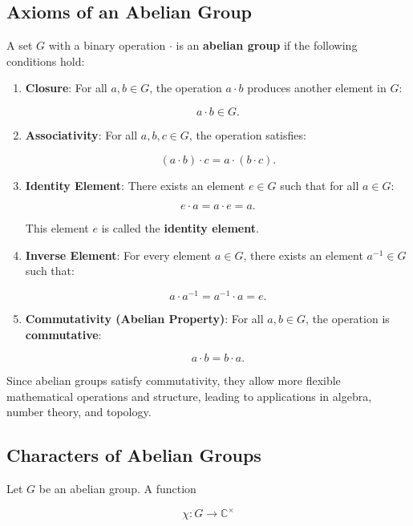 \documentclass[11pt]{article}
\theoremstyle{definition}
\begin{document}
\subsection{Axioms of an Abelian Group}
A set \( G \) with a binary operation \( \cdot \) is an \textbf{abelian group} if the following conditions hold:

\begin{enumerate}
    \item \textbf{Closure}:  
    For all \( a, b \in G \), the operation \( a \cdot b \) produces another element in \( G \):

    \[
    a \cdot b \in G.
    \]

    \item \textbf{Associativity}:  
    For all \( a, b, c \in G \), the operation satisfies:

    \[
    (a \cdot b) \cdot c = a \cdot (b \cdot c).
    \]

    \item \textbf{Identity Element}:  
    There exists an element \( e \in G \) such that for all \( a \in G \):

    \[
    e \cdot a = a \cdot e = a.
    \]

    This element \( e \) is called the \textbf{identity element}.

    \item \textbf{Inverse Element}:  
    For every element \( a \in G \), there exists an element \( a^{-1} \in G \) such that:

    \[
    a \cdot a^{-1} = a^{-1} \cdot a = e.
    \]

    \item \textbf{Commutativity (Abelian Property)}:  
    For all \( a, b \in G \), the operation is \textbf{commutative}:

    \[
    a \cdot b = b \cdot a.
    \]

\end{enumerate}

Since abelian groups satisfy commutativity, they allow more flexible mathematical operations and structure, leading to applications in algebra, number theory, and topology.

\subsection{Characters of Abelian Groups}
Let \( G \) be an abelian group. A function  

\[
\chi: G \to \mathbb{C}^{\times}
\]
\end{document}
